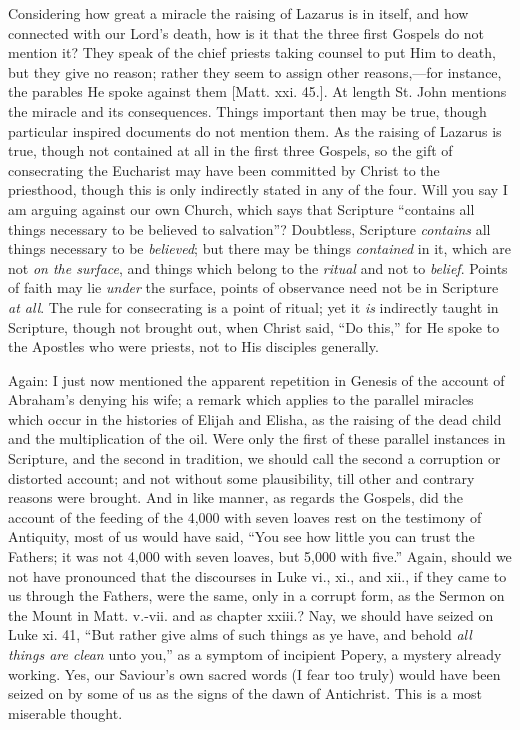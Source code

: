 Considering how great a miracle the raising of Lazarus is in
itself, and how connected with our Lord's death, how is it that the
three first Gospels do not mention it? They speak of the chief priests
taking counsel to put Him to death, but they give no reason;
rather they seem to assign other reasons,—for instance, the parables
He spoke against them [Matt. xxi. 45.]. At length St. John mentions
the miracle and its consequences. Things important then may be true,
though particular inspired documents do not mention them. As the
raising of Lazarus is true, though not contained at all in the first
three Gospels, so the gift of consecrating the Eucharist may have been
committed by Christ to the priesthood, though this is only indirectly
stated in any of the four. Will you say I am arguing against our own
Church, which says that Scripture ``contains all things necessary
to be believed to salvation''? Doubtless, Scripture \emph{contains}
all things necessary to be \emph{believed}; but there may be things \emph{contained}
in it, which are not \emph{on the surface}, and things which belong to
the \emph{ritual} and not to \emph{belief}. Points of faith may lie \emph{under}
the surface, points of observance need not be in Scripture \emph{at all}.
The rule for consecrating is a point of ritual; yet it \emph{is}
indirectly taught in Scripture, though not brought out, when Christ
said, ``Do this,'' for He spoke to the Apostles who were
priests, not to His disciples generally.

Again: I just now mentioned the apparent repetition in Genesis of
the account of Abraham's denying his wife; a remark which applies to
the parallel miracles which occur in the histories of Elijah and
Elisha, as the raising of the dead child and the multiplication of the
oil. Were only the first of these parallel instances in Scripture, and
the second in tradition, we should call the second a corruption or
distorted account; and not without some plausibility, till other and
contrary reasons were brought. And in like manner, as regards the
Gospels, did the account of the feeding of the 4,000 with seven
loaves rest on the testimony of Antiquity, most of us would have said,
``You see how little you can trust the Fathers; it was not 4,000
with seven loaves, but 5,000 with five.'' Again, should we not
have pronounced that the discourses in Luke vi., xi., and xii., if
they came to us through the Fathers, were the same, only in a corrupt
form, as the Sermon on the Mount in Matt. v.-vii. and as chapter xxiii.?
Nay, we should have seized on Luke xi. 41, ``But rather give alms
of such things as ye have, and behold \emph{all things are clean} unto
you,'' as a symptom of incipient Popery, a mystery already
working. Yes, our Saviour's own sacred words (I fear too truly) would
have been seized on by some of us as the signs of the dawn of
Antichrist. This is a most miserable thought.

